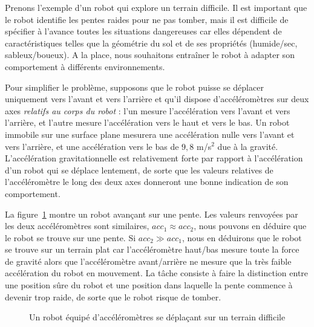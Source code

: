 Prenons l'exemple d'un robot qui explore un terrain difficile. Il est important que le robot identifie les pentes raides pour ne pas tomber, mais il est difficile de spécifier à l'avance toutes les situations dangereuses car elles dépendent de caractéristiques telles que la géométrie du sol et de ses propriétés (humide/sec, sableux/boueux). A la place, nous souhaitons entraîner le robot à adapter son comportement à différents environnements.

Pour simplifier le problème, supposons que le robot puisse se déplacer uniquement vers l'avant et vers l'arrière et qu'il dispose d'accéléromètres sur deux axes \emph{relatifs au corps du robot} : l'un mesure l'accélération vers l'avant et vers l'arrière, et l'autre mesure l'accélération vers le haut et vers le bas. Un robot immobile sur une surface plane mesurera une accélération nulle vers l'avant et vers l'arrière, et une accélération vers le bas de $9,8$ m/s$^{2}$ due à la gravité. L'accélération gravitationnelle est relativement forte par rapport à l'accélération d'un robot qui se déplace lentement, de sorte que les valeurs relatives de l'accéléromètre le long des deux axes donneront une bonne indication de son comportement.

La figure~\ref{fig.slopes} montre un robot avançant sur une pente. Les valeurs renvoyées par les deux accéléromètres sont similaires, $\mathit{acc}_1\approx \mathit{acc}_2$, nous pouvons en déduire que le robot se trouve sur une pente. Si $\mathit{acc}_2\gg\mathit{acc}_1$, nous en déduirons que le robot se trouve sur un terrain plat car l'accéléromètre haut/bas mesure toute la force de gravité alors que l'accéléromètre avant/arrière ne mesure que la très faible accélération du robot en mouvement. La tâche consiste à faire la distinction entre une position sûre du robot et une position dans laquelle la pente commence à devenir trop raide, de sorte que le robot risque de tomber.

\begin{figure}
\begin{center}
\end{center}
\caption{Un robot équipé d'accéléromètres se déplaçant sur un terrain difficile}\label{fig.slopes}
\end{figure}

